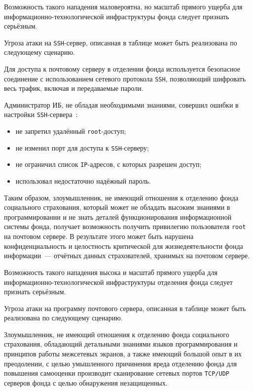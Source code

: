Возможность такого нападения маловероятна, но масштаб прямого ущерба
для информационно-технологической инфраструктуры \linebreak фонда
следует признать серьёзным.

\point Угроза атаки на \texttt{SSH}-сервер, описанная в таблице может
быть реализована по следующему сценарию.

\point Для доступа к почтовому серверу в отделении фонда используется
безопасное соединение с использованием сетевого протокола
\texttt{SSH}, позволяющий шифровать весь трафик, включая и
передаваемые пароли.

Администратор ИБ, не обладая необходимыми знаниями, совершил ошибки в
настройки \texttt{SSH}-сервера~\cite{4}:

\begin{itemize}
\item не запретил удалённый \texttt{root}-доступ;
\item не изменил порт для доступа к \texttt{SSH}-серверу;
\item не ограничил список \texttt{IP}-адресов, с которых разрешен
  доступ;
\item использовал недостаточно надёжный пароль.
\end{itemize}

Таким образом, злоумышленник, не имеющий отношения к отделению фонда
социального страхования, который может не обладать высоким знаниями в
программировании и не знать деталей функционирования информационной
системы фонда, получает возможность получить привилегию пользователя
\texttt{root} на почтовом сервере. В результате этого может быть
нарушена конфиденциальность и целостность критической для
жизнедеятельности фонда информации~--- отчётных данных страхователей,
хранимых на почтовом сервере.

Возможность такого нападения высока и масштаб прямого ущерба для
информационно-технологической инфраструктуры отделения \linebreak
фонда следует признать серьёзным.

\point Угроза атаки на программу почтового сервера, описанная в
таблице может быть реализована по следующему сценарию.

\point Злоумышленник, не имеющий отношения к отделению фонда
социального страхования, обладающий детальными знаниями языков
программирования и принципов работы межсетевых экранов, а также
имеющий большой опыт в их преодолении, с целью умышленного причинения
вреда отделению фонда для повышения самооценки производит сканирование
сетевых портов \texttt{TCP/UDP} серверов фонда с целью обнаружения
незащищенных.

